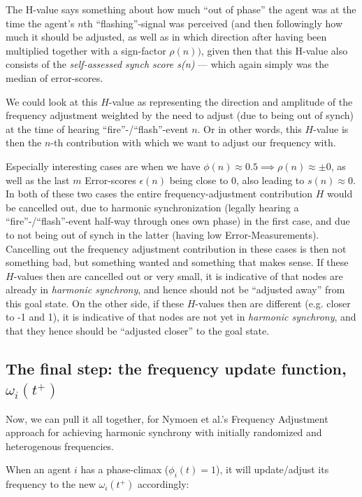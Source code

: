 The H-value says something about how much ``out of phase'' the agent was at the time the agent's $n$th ``flashing''-signal was perceived (and then followingly how much it should be adjusted, as well as in which direction after having been multiplied together with a sign-factor $\rho(n))$, given then that this H-value also consists of the \textit{self-assessed synch score s(n)} — which again simply was the median of error-scores.

We could look at this $H$-value as representing the direction and amplitude of the frequency adjustment weighted by the need to adjust (due to being out of synch) at the time of hearing ``fire''-/``flash''-event $n$. Or in other words, this $H$-value is then the $n$-th contribution with which we want to adjust our frequency with.

Especially interesting cases are when we have $\phi(n)\approx0.5 \implies \rho(n)\approx\pm0$, as well as the last $m$ Error-scores $\epsilon(n)$ being close to 0, also leading to $s(n)\approx0$. In both of these two cases the entire frequency-adjustment contribution $H$ would be cancelled out, due to harmonic synchronization (legally hearing a ``fire''-/``flash''-event half-way through ones own phase) in the first case, and due to not being out of synch in the latter (having low Error-Measurements). Cancelling out the frequency adjustment contribution in these cases is then not something bad, but something wanted and something that makes sense. If these $H$-values then are cancelled out or very small, it is indicative of that nodes are already in \textit{harmonic synchrony}, and hence should not be ``adjusted away'' from this goal state. On the other side, if these $H$-values then are different (e.g. closer to -1 and 1), it is indicative of that nodes are not yet in \textit{harmonic synchrony}, and that they hence should be ``adjusted closer'' to the goal state.

\subsection{The final step: the frequency update function, $\omega_i(t^+)$}

Now, we can pull it all together, for Nymoen et al.'s Frequency Adjustment approach for achieving harmonic synchrony with initially randomized and heterogenous frequencies.

When an agent $i$ has a phase-climax ($\phi_i(t)=1$), it will update/adjust its frequency to the new $\omega_i(t^+)$ accordingly:

